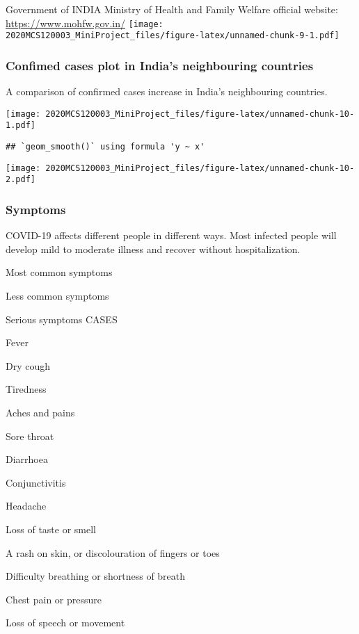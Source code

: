 \documentclass[
]{article}
\begin{document}
Government of INDIA Ministry of Health and Family Welfare official
website: \url{https://www.mohfw.gov.in/}
\texttt{[image: 2020MCS120003\_MiniProject\_files/figure-latex/unnamed-chunk-9-1.pdf]}

\hypertarget{confimed-cases-plot-in-indias-neighbouring-countries}{%
\subsubsection{Confimed cases plot in India's neighbouring
countries}\label{confimed-cases-plot-in-indias-neighbouring-countries}}

A comparison of confirmed cases increase in India's neighbouring
countries.

\texttt{[image: 2020MCS120003\_MiniProject\_files/figure-latex/unnamed-chunk-10-1.pdf]}

\begin{verbatim}
## `geom_smooth()` using formula 'y ~ x'
\end{verbatim}

\texttt{[image: 2020MCS120003\_MiniProject\_files/figure-latex/unnamed-chunk-10-2.pdf]}

\hypertarget{symptoms}{%
\subsubsection{Symptoms}\label{symptoms}}

COVID-19 affects different people in different ways. Most infected
people will develop mild to moderate illness and recover without
hospitalization.

Most common symptoms

Less common symptoms

Serious symptoms CASES

Fever

Dry cough

Tiredness

Aches and pains

Sore throat

Diarrhoea

Conjunctivitis

Headache

Loss of taste or smell

A rash on skin, or discolouration of fingers or toes

Difficulty breathing or shortness of breath

Chest pain or pressure

Loss of speech or movement
\end{document}

